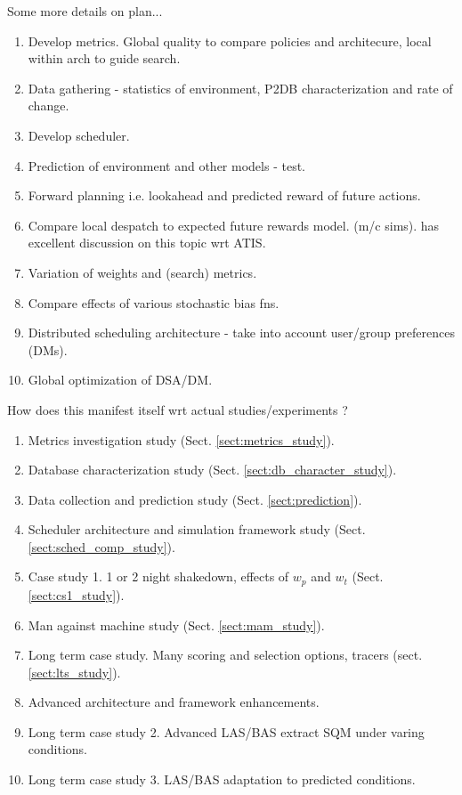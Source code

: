 Some more details on plan...
\begin{enumerate}
\item Develop metrics. Global quality to compare policies and architecure, local within arch to guide search.
\item Data gathering - statistics of environment, P2DB characterization and rate of change.
\item Develop scheduler.
\item Prediction of environment and other models - test.
\item Forward planning i.e. lookahead and predicted reward of future actions.
\item Compare local despatch to expected future rewards model.  (m/c sims). \cite{bresina95expected} has excellent discussion on this topic wrt ATIS.
\item Variation of weights and (search) metrics.
\item Compare effects of various stochastic bias fns.
\item Distributed scheduling architecture - take into account user/group preferences (DMs).
\item Global optimization of DSA/DM.

\end{enumerate}

How does this manifest itself wrt actual studies/experiments ?
\begin{enumerate}
\item Metrics investigation study (Sect. \ref{sect:metrics_study}).
\item Database characterization study (Sect. \ref{sect:db_character_study}).
\item Data collection and prediction study (Sect. \ref{sect:prediction}).
\item Scheduler architecture and simulation framework study (Sect. \ref{sect:sched_comp_study}).
\item Case study 1. 1 or 2 night shakedown, effects of $w_p$ and $w_t$ (Sect. \ref{sect:cs1_study}).
\item Man against machine study (Sect. \ref{sect:mam_study}).
\item Long term case study. Many scoring and selection options, tracers (sect. \ref{sect:lts_study}).
\item Advanced architecture and framework enhancements.
\item Long term case study 2. Advanced LAS/BAS extract SQM under varing conditions.
\item Long term case study 3. LAS/BAS adaptation to predicted conditions.
\end{enumerate}

